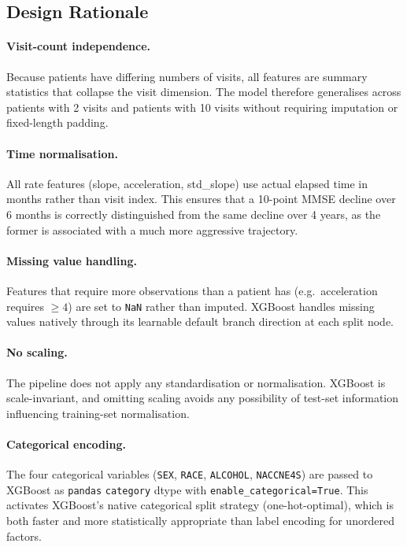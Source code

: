 \documentclass[11pt]{article}
\begin{document}
\subsection{Design Rationale}

\paragraph{Visit-count independence.}  Because patients have differing numbers of visits, all features are summary statistics that collapse the visit dimension.  The model therefore generalises across patients with 2 visits and patients with 10 visits without requiring imputation or fixed-length padding.

\paragraph{Time normalisation.}  All rate features (slope, acceleration, std\_slope) use actual elapsed time in months rather than visit index.  This ensures that a 10-point MMSE decline over 6 months is correctly distinguished from the same decline over 4 years, as the former is associated with a much more aggressive trajectory.

\paragraph{Missing value handling.}  Features that require more observations than a patient has (e.g.\ acceleration requires $\geq 4$) are set to \texttt{NaN} rather than imputed.  XGBoost handles missing values natively through its learnable default branch direction at each split node.

\paragraph{No scaling.}  The pipeline does not apply any standardisation or normalisation.  XGBoost is scale-invariant, and omitting scaling avoids any possibility of test-set information influencing training-set normalisation.

\paragraph{Categorical encoding.}  The four categorical variables (\texttt{SEX}, \texttt{RACE}, \texttt{ALCOHOL}, \texttt{NACCNE4S}) are passed to XGBoost as \texttt{pandas} \texttt{category} dtype with \texttt{enable\_categorical=True}.  This activates XGBoost's native categorical split strategy (one-hot-optimal), which is both faster and more statistically appropriate than label encoding for unordered factors.
\end{document}
